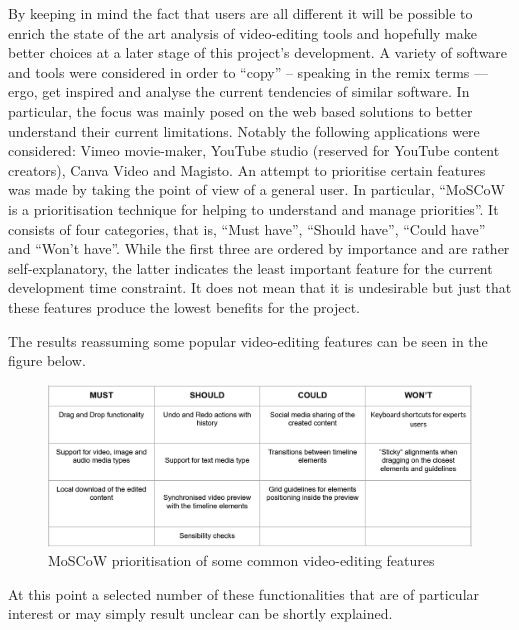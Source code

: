 By keeping in mind the fact that users are all different it will be possible to enrich the state of the art analysis of video-editing tools and hopefully make better choices at a later stage of this project’s development.
A variety of software and tools were considered in order to “copy” – speaking in the remix terms — ergo, get inspired and analyse the current tendencies of similar software.
In particular, the focus was mainly posed on the web based solutions to better understand their current limitations. Notably the following applications were considered: Vimeo movie-maker, YouTube studio (reserved for YouTube content creators), Canva Video and Magisto.
An attempt to prioritise certain features was made by taking the point of view of a general user. In particular, “MoSCoW is a prioritisation technique for helping to understand and manage priorities”. It consists of four categories, that is, “Must have”, “Should have”, “Could have” and “Won’t have”. While the first three are ordered by importance and are rather self-explanatory, the latter indicates the least important feature for the current development time constraint. It does not mean that it is undesirable but just that these features produce the lowest benefits for the project.

The results reassuming some popular video-editing features can be seen in the figure below.

\begin{figure}[H]
\centering
\includegraphics[width=1\textwidth]{images/moscow.PNG}
\caption{MoSCoW prioritisation of some common video-editing features}
\label{fig:moscow}
\end{figure}

At this point a selected number of these functionalities that are of particular interest or may simply result unclear can be shortly explained.

